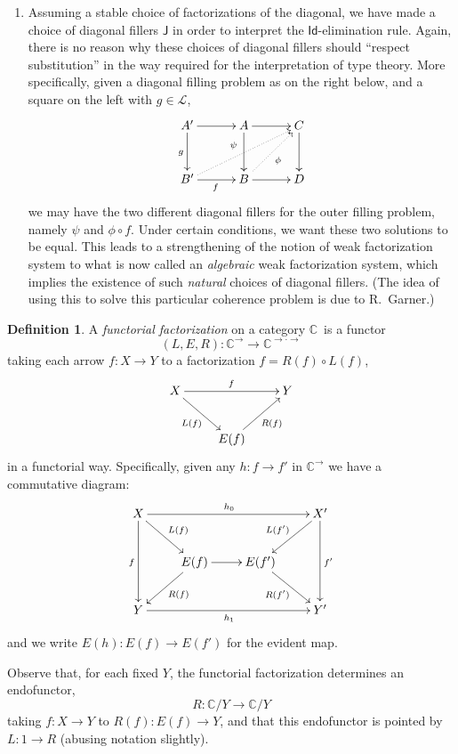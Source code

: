 \documentclass[12pt]{article}
\newcommand{\C}{\ensuremath{\mathbb{C}}}
\renewcommand{\L}{\ensuremath{\mathcal{L}}}
\newcommand{\arr}{\ensuremath{\rightarrow}}
\newcommand{\Id}{\ensuremath{\mathsf{Id}}}
\theoremstyle{remark}
\theoremstyle{definition}
\newtheorem{definition}[theorem]{Definition}
\begin{document}
\begin{enumerate}
\item Assuming a stable choice of factorizations of the diagonal, we have made a choice of diagonal fillers $\mathsf{J}$ in order to interpret the $\Id$-elimination rule.  Again, there is no reason why these choices of diagonal fillers should ``respect substitution'' in the way required for the interpretation of type theory. 
More specifically, given a diagonal filling problem as on the right below, and a square on the left with $g\in\L$,
\begin{equation}\label{diagram:coherencefillers}
\xymatrix@=3em{
A' \ar[d]_g \ar[r] & A  \ar[d] \ar[r] & \ar[d] C \\
B' \ar[r]_{f} \ar@{..>}[rru]^{\psi\ \ } & B\ar@{..>}[ru]_{\phi} \ar[r] & D
}
\end{equation}
we may have the two different diagonal fillers for the outer filling problem, namely $\psi$ and $\phi\circ f$.  Under certain conditions, we want  these two solutions to be equal.
This leads to a strengthening of the notion of weak factorization system to what is now called an \emph{algebraic} weak factorization system, which implies the existence of such \emph{natural} choices of diagonal fillers. (The idea of using this to solve this particular coherence problem is due to R.~Garner.)

\end{enumerate}

\begin{definition} A \emph{functorial factorization} on a category \C\ is a functor
\[
(L,E,R) : \C^{\arr} \to \C^{\arr\cdot\arr}
\]
taking each arrow $f : X \to Y$ to a factorization $f = R(f)\circ L(f)$,
\[
\xymatrix{
 X \ar[rr]^{f} \ar[rd]_{L(f)} && Y\\
& E(f) \ar[ru]_{R(f)}  &
}
\]
in a functorial way.  Specifically, given any $h : f \to f'$ in $\C^{\arr}$ we have a commutative diagram:
\[
\xymatrix{
X \ar[dd]_{f} \ar[rd]^{L(f)} \ar[rrr]^{h_0} &&& \ar[dd]^{f'} \ar[ld]_{L(f')} X'\\
   & E(f) \ar[r] \ar[ld]^{R(f)} & E(f') \ar[rd]_{R(f')} & \\
Y  \ar[rrr]_{h_1} &&&  Y'
}
\]
and we write $E(h) : E(f)\to E(f')$ for the evident map.
\end{definition}

Observe that, for each fixed $Y$, the functorial factorization determines an endofunctor, 
\[
R : \C/Y \to \C/Y
\]
taking $f:X\to Y$ to $R(f) :E(f) \to Y$, and that this endofunctor is pointed by $L : 1 \to R$ (abusing notation slightly).
\end{document}
